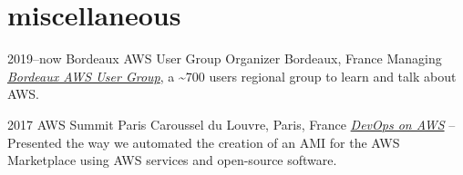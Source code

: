 \documentclass[]{cv-a4}
\begin{document}

\section{miscellaneous}

\begin{entrylist}

  \entry
  {2019--now}
  {Bordeaux AWS User Group Organizer}
  {Bordeaux, France}
  {
    Managing \emph{\href{https://www.meetup.com/fr-FR/Bordeaux-Amazon-Web-Services/}{Bordeaux AWS User Group}},
    a \~{}700 users regional group to learn and talk about AWS.
  }


  \entry
  {2017}
  {AWS Summit Paris}
  {Caroussel du Louvre, Paris, France}
  {\emph{\href{https://youtu.be/54cwFTMPxOo}{DevOps on AWS} } -- Presented the way we automated the creation of an AMI for the AWS Marketplace using AWS services and open-source software.}


\end{entrylist}
\end{document}
